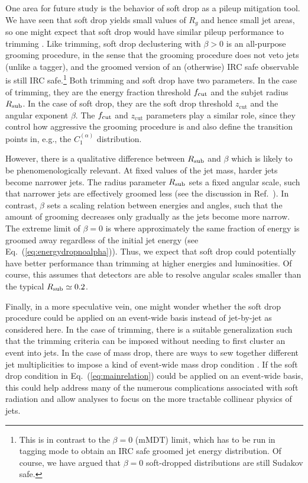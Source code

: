 \documentclass[letterpaper,11pt]{article}
\newcommand{\C}[2]{C^{(#2)}_{#1}}
\newcommand{\zcut}{z_\text{cut}}
\newcommand{\ea}{{\C{1}{\alpha}}}
\DeclareRobustCommand{\Eq}[1]{Eq.~(\ref{#1})}
\DeclareRobustCommand{\Ref}[1]{Ref.~\cite{#1}}
\begin{document}
One area for future study is the behavior of soft drop as a pileup mitigation tool.  We have seen that soft drop yields small values of $R_g$ and hence small jet areas, so one might expect that soft drop would have similar pileup performance to trimming \cite{trimming,ATLAS:2012jla,TheATLAScollaboration:2013ria,cms}.  Like trimming, soft drop declustering with $\beta > 0$ is an all-purpose grooming procedure, in the sense that the grooming procedure does not veto jets (unlike a tagger), and the groomed version of an (otherwise) IRC safe observable is still IRC safe.\footnote{This is in contrast to the $\beta = 0$ (mMDT) limit, which has to be run in tagging mode to obtain an IRC safe groomed jet energy distribution.  Of course, we have argued that $\beta = 0$ soft-dropped distributions are still Sudakov safe.}   Both trimming and soft drop have two parameters.  In the case of trimming, they are the energy fraction threshold $f_{\rm cut}$ and the subjet radius $R_{\rm sub}$.  In the case of soft drop, they are the soft drop threshold $\zcut$ and the angular exponent $\beta$.  The $f_{\rm cut}$ and $\zcut$ parameters play a similar role, since they control how aggressive the grooming procedure is and also define the transition points in, e.g., the $\ea$ distribution.  

However, there is a qualitative difference between $R_{\rm sub}$ and $\beta$ which is likely to be phenomenologically relevant.  At fixed values of the jet mass, harder jets become narrower jets.  The radius parameter $R_{\rm sub}$ sets a fixed angular scale, such that narrower jets are effectively groomed less (see the discussion in \Ref{taggersRES}).  In contrast, $\beta$ sets a scaling relation between energies and angles, such that the amount of grooming decreases only gradually as the jets become more narrow.  The extreme limit of $\beta = 0$ is where approximately the same fraction of energy is groomed away regardless of the initial jet energy (see \Eq{eq:energydropnoalpha}).  Thus, we expect that soft drop could potentially have better performance than trimming at higher energies and luminosities.  Of course, this assumes that detectors are able to resolve angular scales smaller than the typical $R_{\rm sub} \simeq 0.2$.

Finally, in a more speculative vein, one might wonder whether the soft drop procedure could be applied on an event-wide basis instead of jet-by-jet as considered here.  In the case of trimming, there is a suitable generalization \cite{Bertolini:2013iqa} such that the trimming criteria can be imposed without needing to first cluster an event into jets.  In the case of mass drop, there are ways to sew together different jet multiplicities to impose a kind of event-wide mass drop condition \cite{Gouzevitch:2013qca}.  If the soft drop condition in \Eq{eq:mainrelation} could be applied on an event-wide basis, this could help address many of the numerous complications associated with soft radiation and allow analyses to focus on the more tractable collinear physics of jets.
\end{document}
